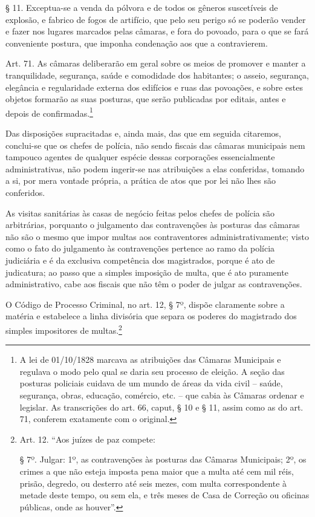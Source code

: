 § 11. Exceptua-se a venda da pólvora e de todos os gêneros suscetíveis
de explosão, e fabrico de fogos de artifício, que pelo seu perigo só se
poderão vender e fazer nos lugares marcados pelas câmaras, e fora do
povoado, para o que se fará conveniente postura, que imponha condenação
aos que a contravierem.

Art. 71. As câmaras deliberarão em geral sobre os meios de promover e
manter a tranquilidade, segurança, saúde e comodidade dos habitantes; o
asseio, segurança, elegância e regularidade externa dos edifícios e ruas
das povoações, e sobre estes objetos formarão as suas posturas, que
serão publicadas por editais, antes e depois de confirmadas.\footnote{
  A lei de 01/10/1828 marcava as atribuições das Câmaras Municipais e
  regulava o modo pelo qual se daria seu processo de eleição. A seção
  das posturas policiais cuidava de um mundo de áreas da vida civil --
  saúde, segurança, obras, educação, comércio, etc. -- que cabia às
  Câmaras ordenar e legislar. As transcrições do art. 66, caput, § 10 e
  § 11, assim como as do art. 71, conferem exatamente com o original.}

Das disposições supracitadas e, ainda mais, das que em seguida
citaremos, conclui-se que os chefes de polícia, não sendo fiscais das
câmaras municipais nem tampouco agentes de qualquer espécie dessas
corporações essencialmente administrativas, não podem ingerir-se nas
atribuições a elas conferidas, tomando a si, por mera vontade própria, a
prática de atos que por lei não lhes são conferidos.

As visitas sanitárias às casas de negócio feitas pelos chefes de polícia
são arbitrárias, porquanto o julgamento das contravenções às posturas
das câmaras não são o mesmo que impor multas aos contraventores
administrativamente; visto como o fato do julgamento às contravenções
pertence ao ramo da polícia judiciária e é da exclusiva competência dos
magistrados, porque é ato de judicatura; ao passo que a simples
imposição de multa, que é ato puramente administrativo, cabe aos fiscais
que não têm o poder de julgar as contravenções.

O Código de Processo Criminal, no art. 12, § 7º, dispõe claramente sobre
a matéria e estabelece a linha divisória que separa os poderes do
magistrado dos simples impositores de multas.\footnote{Art. 12. ``Aos
  juízes de paz compete:

  § 7º. Julgar: 1º, as contravenções às posturas das Câmaras Municipais;
  2º, os crimes a que não esteja imposta pena maior que a multa até cem
  mil réis, prisão, degredo, ou desterro até seis mezes, com multa
  correspondente à metade deste tempo, ou sem ela, e três meses de Casa
  de Correção ou oficinas públicas, onde as houver''.}

